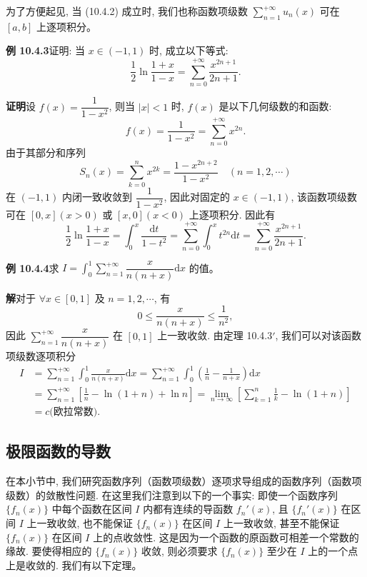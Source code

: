 \documentclass[UTF8, 12pt, fontset=fandol, oneside]{ctexart}
\begin{document}
为了方便起见, 当 (10.4.2) 成立时, 我们也称函数项级数 $\sum\limits_{n=1}^{+\infty}u_n(x)$ 可在 $[a,b]$ 上逐项积分。

\noindent\textbf{例 10.4.3}\quad 证明: 当 $x\in(-1,1)$ 时, 成立以下等式:
\[
  \frac12\ln\frac{1+x}{1-x}
  =\sum_{n=0}^{+\infty}\frac{x^{2n+1}}{2n+1}.
\]

\noindent\textbf{证明}\quad 设 $f(x)=\dfrac1{1-x^2}$, 则当 $|x|<1$ 时, $f(x)$ 是以下几何级数的和函数:
\[
  f(x)=\frac1{1-x^2}=\sum_{n=0}^{+\infty}x^{2n}.
\]
由于其部分和序列
\[
  S_n(x)=\sum_{k=0}^n x^{2k}=\frac{1-x^{2n+2}}{1-x^2}\quad(n=1,2,\cdots)
\]
在 $(-1,1)$ 内闭一致收敛到 $\dfrac1{1-x^2}$, 因此对固定的 $x\in(-1,1)$, 该函数项级数可在 $[0,x](x>0)$ 或 $[x,0](x<0)$ 上逐项积分. 因此有
\[
  \frac12\ln\frac{1+x}{1-x}
  =\int_0^x\frac{\mathrm dt}{1-t^2}
  =\sum_{n=0}^{+\infty}\int_0^x t^{2n}\mathrm dt
  =\sum_{n=0}^{+\infty}\frac{x^{2n+1}}{2n+1}.
\]

\noindent\textbf{例 10.4.4}\quad 求 $I=\int_0^1\sum\limits_{n=1}^{+\infty}\dfrac{x}{n(n+x)}\mathrm dx$ 的值。

\noindent\textbf{解}\quad 对于 $\forall x\in[0,1]$ 及 $n=1,2,\cdots$, 有
\[
  0\leq\frac{x}{n(n+x)}\leq\frac1{n^2},
\]
因此 $\sum\limits_{n=1}^{+\infty}\dfrac{x}{n(n+x)}$ 在 $[0,1]$ 上一致收敛. 由定理 10.4.3$'$, 我们可以对该函数项级数逐项积分
\[
\begin{aligned}
  I
  &=\sum_{n=1}^{+\infty}\int_0^1\frac{x}{n(n+x)}\mathrm dx
   =\sum_{n=1}^{+\infty}\int_0^1\left(\frac1n-\frac1{n+x}\right)\mathrm dx\\
  &=\sum_{n=1}^{+\infty}\left[\frac1n-\ln(1+n)+\ln n\right]
   =\lim_{n\to\infty}\left[\sum_{k=1}^n\frac1k-\ln(1+n)\right]\\
  &=c\text{(欧拉常数)}.
\end{aligned}
\]

\subsection{极限函数的导数}

在本小节中, 我们研究函数序列（函数项级数）逐项求导组成的函数序列（函数项级数）的敛散性问题. 在这里我们注意到以下的一个事实: 即使一个函数序列 $\{f_n(x)\}$ 中每个函数在区间 $I$ 内都有连续的导函数 $f_n'(x)$, 且 $\{f_n'(x)\}$ 在区间 $I$ 上一致收敛, 也不能保证 $\{f_n(x)\}$ 在区间 $I$ 上一致收敛, 甚至不能保证 $\{f_n(x)\}$ 在区间 $I$ 上的点收敛性. 这是因为一个函数的原函数可相差一个常数的缘故. 要使得相应的 $\{f_n(x)\}$ 收敛, 则必须要求 $\{f_n(x)\}$ 至少在 $I$ 上的一个点上是收敛的. 我们有以下定理。
\end{document}
